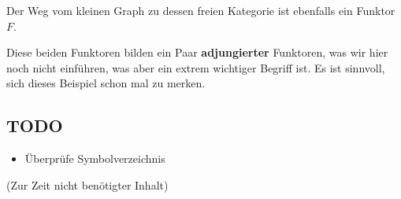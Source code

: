 \documentclass[a4paper]{amsart}
\theoremstyle{definition}
\begin{document}
Der Weg vom kleinen Graph zu dessen freien Kategorie ist ebenfalls ein Funktor $F$.

Diese beiden Funktoren bilden ein Paar \textbf{adjungierter} Funktoren, was wir hier noch nicht einführen, was aber ein extrem wichtiger Begriff ist. Es ist sinnvoll, sich dieses Beispiel schon mal zu merken.

\begin{backup}
\section{TODO}

\begin{itemize}
     \item Überprüfe Symbolverzeichnis
\end{itemize}

\end{backup}

\begin{backup}
    (Zur Zeit nicht benötigter Inhalt)
\end{backup}
\end{document}
